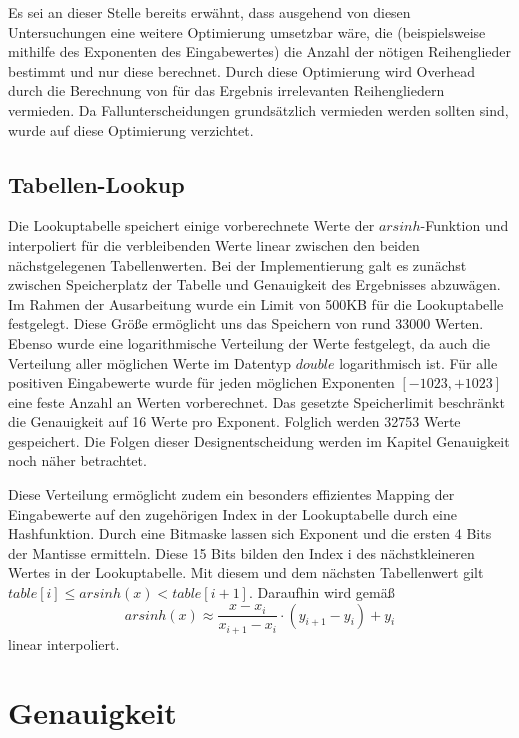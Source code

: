 \documentclass[course=erap] {aspdoc}
\begin{document}
    Es sei an dieser Stelle bereits erwähnt, dass ausgehend von diesen Untersuchungen eine weitere Optimierung umsetzbar wäre, die (beispielsweise mithilfe des Exponenten des Eingabewertes) die Anzahl der nötigen Reihenglieder bestimmt und nur diese berechnet.
    Durch diese Optimierung wird Overhead durch die Berechnung von für das Ergebnis irrelevanten Reihengliedern vermieden.
    Da Fallunterscheidungen grundsätzlich vermieden werden sollten sind, wurde auf diese Optimierung verzichtet.


    \subsection{Tabellen-Lookup}
    Die Lookuptabelle speichert einige vorberechnete Werte der $arsinh$-Funktion und interpoliert für die verbleibenden Werte linear zwischen den beiden nächstgelegenen Tabellenwerten.
    Bei der Implementierung galt es zunächst zwischen Speicherplatz der Tabelle und Genauigkeit des Ergebnisses abzuwägen.
    Im Rahmen der Ausarbeitung wurde ein Limit von 500KB für die Lookuptabelle festgelegt.
    Diese Größe ermöglicht uns das Speichern von rund 33000 Werten.
    Ebenso wurde eine logarithmische Verteilung der Werte festgelegt, da auch die Verteilung aller möglichen Werte im Datentyp $double$ logarithmisch ist.
    Für alle positiven Eingabewerte wurde für jeden möglichen Exponenten $[-1023, +1023]$ eine feste Anzahl an Werten vorberechnet.
    Das gesetzte Speicherlimit beschränkt die Genauigkeit auf 16 Werte pro Exponent.
    Folglich werden 32753 Werte gespeichert.
    Die Folgen dieser Designentscheidung werden im Kapitel Genauigkeit noch näher betrachtet.

    Diese Verteilung ermöglicht zudem ein besonders effizientes Mapping der Eingabewerte auf den zugehörigen Index in der Lookuptabelle durch eine Hashfunktion.
    Durch eine Bitmaske lassen sich Exponent und die ersten 4 Bits der Mantisse ermitteln.
    Diese 15 Bits bilden den Index i des nächstkleineren Wertes in der Lookuptabelle.
    Mit diesem und dem nächsten Tabellenwert gilt $table[i] \leq arsinh(x) < table[i+1]$.
    Daraufhin wird gemäß
    \[
        arsinh(x) \approx \frac{x-x_i}{x_{i+1} - x_i}\cdot (y_{i+1}-y_i) + y_i
    \]
    linear interpoliert.
        \section{Genauigkeit}
\end{document}
